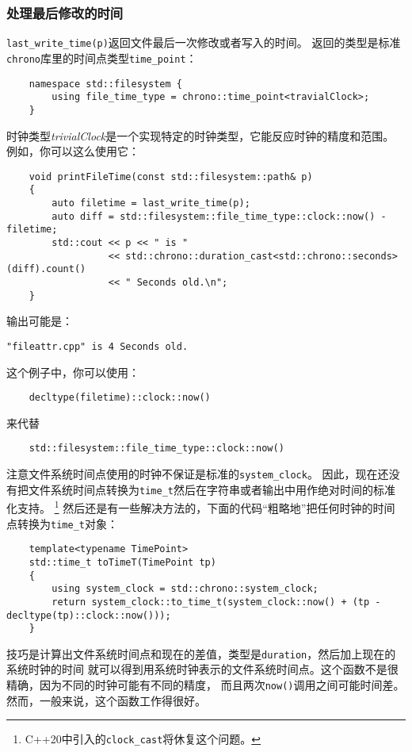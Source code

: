 \subsubsection{处理最后修改的时间}\label{ch20.4.1.3}
\texttt{last\_write\_time(p)}返回文件最后一次修改或者写入的时间。
返回的类型是标准\texttt{chrono}库里的时间点类型\texttt{time\_point}：
\begin{lstlisting}
    namespace std::filesystem {
        using file_time_type = chrono::time_point<travialClock>;
    }
\end{lstlisting}
时钟类型\emph{trivialClock}是一个实现特定的时钟类型，它能反应时钟的精度和范围。
例如，你可以这么使用它：
\begin{lstlisting}
    void printFileTime(const std::filesystem::path& p)
    {
        auto filetime = last_write_time(p);
        auto diff = std::filesystem::file_time_type::clock::now() - filetime;
        std::cout << p << " is "
                  << std::chrono::duration_cast<std::chrono::seconds>(diff).count()
                  << " Seconds old.\n";
    }
\end{lstlisting}
输出可能是：
\begin{lstlisting}[stringstyle=\color{black}]
    "fileattr.cpp" is 4 Seconds old.
\end{lstlisting}
这个例子中，你可以使用：
\begin{lstlisting}
    decltype(filetime)::clock::now()
\end{lstlisting}
来代替
\begin{lstlisting}
    std::filesystem::file_time_type::clock::now()
\end{lstlisting}
注意文件系统时间点使用的时钟不保证是标准的\texttt{system\_clock}。
因此，现在还没有把文件系统时间点转换为\texttt{time\_t}然后在字符串或者输出中用作绝对时间的标准化支持。
\footnote{C++20中引入的\texttt{clock\_cast}将休复这个问题。}
然后还是有一些解决方法的，下面的代码“粗略地”把任何时钟的时间点转换为\texttt{time\_t}对象：
\begin{lstlisting}
    template<typename TimePoint>
    std::time_t toTimeT(TimePoint tp)
    {
        using system_clock = std::chrono::system_clock;
        return system_clock::to_time_t(system_clock::now() + (tp - decltype(tp)::clock::now()));
    }
\end{lstlisting}
技巧是计算出文件系统时间点和现在的差值，类型是\texttt{duration}，然后加上现在的系统时钟的时间
就可以得到用系统时钟表示的文件系统时间点。这个函数不是很精确，因为不同的时钟可能有不同的精度，
而且两次\texttt{now()}调用之间可能时间差。然而，一般来说，这个函数工作得很好。

